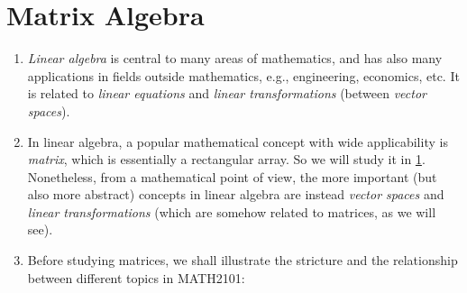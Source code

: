 \section{Matrix Algebra}
\label{sect:matrix-algebra}
\begin{enumerate}
\item \emph{Linear algebra} is central to many areas of mathematics, and has
also many applications in fields outside mathematics, e.g., engineering,
economics, etc. It is related to \emph{linear equations} and \emph{linear
transformations} (between \emph{vector spaces}).

\item In linear algebra, a popular mathematical concept with wide applicability
is \emph{matrix}, which is essentially a rectangular array. So we will study it
in \cref{sect:matrix-algebra}. Nonetheless, from a mathematical point of view,
the more important (but also more abstract) concepts in linear algebra are
instead \emph{vector spaces} and \emph{linear transformations} (which are
somehow related to matrices, as we will see).

\item Before studying matrices, we shall illustrate the stricture and the
relationship between different topics in MATH2101:
\begin{center}
\end{center}
\end{enumerate}
